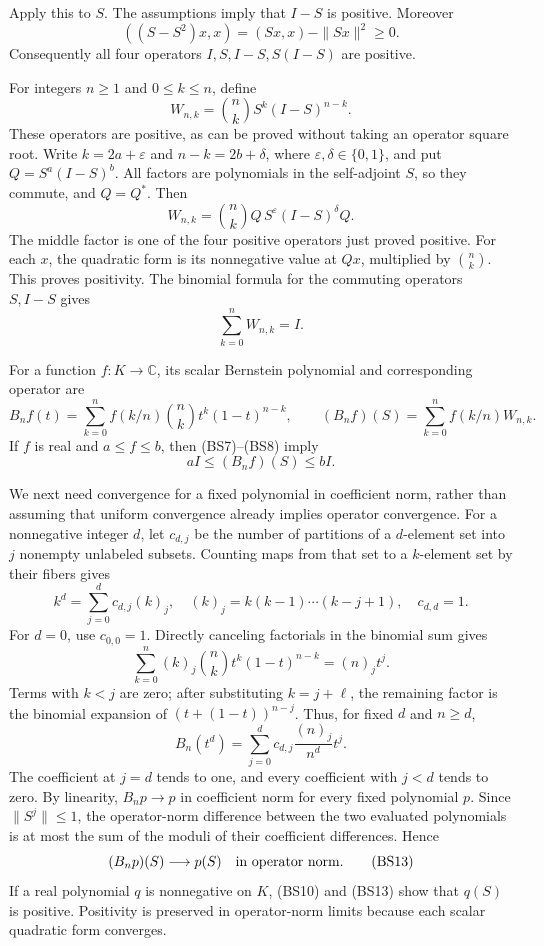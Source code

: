 \documentclass[
  11pt,
]{article}
\begin{document}
Apply this to \(S\). The assumptions imply that \(I-S\) is positive.
Moreover \[
 ((S-S^2)x,x)=(Sx,x)-\|Sx\|^2\geq0.
 \tag{BS6}
\] Consequently all four operators \(I,S,I-S,S(I-S)\) are positive.

For integers \(n\geq1\) and \(0\leq k\leq n\), define \[
 W_{n,k}=\binom nk S^k(I-S)^{n-k}.
 \tag{BS7}
\] These operators are positive, as can be proved without taking an
operator square root. Write \(k=2a+\varepsilon\) and \(n-k=2b+\delta\),
where \(\varepsilon,\delta\in\{0,1\}\), and put \(Q=S^a(I-S)^b\). All
factors are polynomials in the self-adjoint \(S\), so they commute, and
\(Q=Q^*\). Then \[
 W_{n,k}=\binom nk Q\,S^\varepsilon(I-S)^\delta Q.
\] The middle factor is one of the four positive operators just proved
positive. For each \(x\), the quadratic form is its nonnegative value at
\(Qx\), multiplied by \(\binom nk\). This proves positivity. The
binomial formula for the commuting operators \(S,I-S\) gives \[
 \sum_{k=0}^nW_{n,k}=I.
 \tag{BS8}
\]

For a function \(f:K\to\mathbb C\), its scalar Bernstein polynomial and
corresponding operator are \[
 B_nf(t)=\sum_{k=0}^nf(k/n)\binom nk t^k(1-t)^{n-k},
 \qquad (B_nf)(S)=\sum_{k=0}^nf(k/n)W_{n,k}.
 \tag{BS9}
\] If \(f\) is real and \(a\leq f\leq b\), then (BS7)--(BS8) imply \[
 aI\leq(B_nf)(S)\leq bI.
 \tag{BS10}
\]

We next need convergence for a fixed polynomial in coefficient norm,
rather than assuming that uniform convergence already implies operator
convergence. For a nonnegative integer \(d\), let \(c_{d,j}\) be the
number of partitions of a \(d\)-element set into \(j\) nonempty
unlabeled subsets. Counting maps from that set to a \(k\)-element set by
their fibers gives \[
 k^d=\sum_{j=0}^d c_{d,j}(k)_j,
 \quad (k)_j=k(k-1)\cdots(k-j+1),
 \quad c_{d,d}=1.
 \tag{BS11}
\] For \(d=0\), use \(c_{0,0}=1\). Directly canceling factorials in the
binomial sum gives \[
 \sum_{k=0}^n(k)_j\binom nk t^k(1-t)^{n-k}=(n)_j t^j.
\] Terms with \(k<j\) are zero; after substituting \(k=j+\ell\), the
remaining factor is the binomial expansion of \((t+(1-t))^{n-j}\). Thus,
for fixed \(d\) and \(n\geq d\), \[
 B_n(t^d)=\sum_{j=0}^dc_{d,j}\frac{(n)_j}{n^d}t^j.
 \tag{BS12}
\] The coefficient at \(j=d\) tends to one, and every coefficient with
\(j<d\) tends to zero. By linearity, \(B_np\to p\) in coefficient norm
for every fixed polynomial \(p\). Since \(\|S^j\|\leq1\), the
operator-norm difference between the two evaluated polynomials is at
most the sum of the moduli of their coefficient differences. Hence \[
 (B_np)(S)\longrightarrow p(S)\quad\hbox{in operator norm}.
 \tag{BS13}
\] If a real polynomial \(q\) is nonnegative on \(K\), (BS10) and (BS13)
show that \(q(S)\) is positive. Positivity is preserved in operator-norm
limits because each scalar quadratic form converges.
\end{document}
